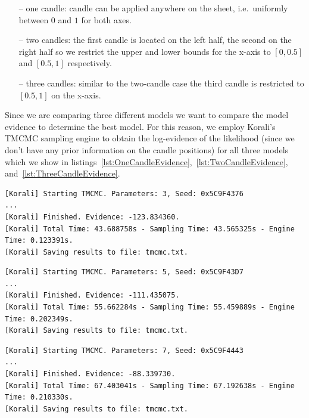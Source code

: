 \documentclass{article}
\begin{document}
    \begin{itemize}
        \item[--] one candle: candle can be applied anywhere on the sheet,
        i.e.\ uniformly between $0$ and $1$ for both axes.
        \item[--] two candles: the first candle is located on the left half,
        the second on the right half so we restrict the upper and lower bounds
        for the x-axis to $[0, 0.5]$ and $[0.5, 1]$ respectively.
        \item[--] three candles: similar to the two-candle case the third
        candle is restricted to $[0.5, 1]$ on the x-axis.
    \end{itemize}

    Since we are comparing three different models we want to compare the
    model evidence to determine the best model.
    For this reason, we employ Korali's TMCMC sampling engine to obtain the
    log-evidence of the likelihood (since we don't have any prior
    information on the candle positions) for all three models which we show in
    listings~\ref{lst:OneCandleEvidence},~\ref{lst:TwoCandleEvidence},
    and~\ref{lst:ThreeCandleEvidence}.

     \begin{lstlisting}[basicstyle=\tiny, frame=single, caption={Korali
    output when sampling the likelihood of the heat distribution given the
     model with one candle.}, label={lst:OneCandleEvidence}]
[Korali] Starting TMCMC. Parameters: 3, Seed: 0x5C9F4376
...
[Korali] Finished. Evidence: -123.834360.
[Korali] Total Time: 43.688758s - Sampling Time: 43.565325s - Engine Time: 0.123391s.
[Korali] Saving results to file: tmcmc.txt.
    \end{lstlisting}
     \begin{lstlisting}[basicstyle=\tiny, frame=single, caption={Korali
    output when sampling the likelihood of the heat distribution given the
     model with two candles.}, label={lst:TwoCandleEvidence}]
[Korali] Starting TMCMC. Parameters: 5, Seed: 0x5C9F43D7
...
[Korali] Finished. Evidence: -111.435075.
[Korali] Total Time: 55.662284s - Sampling Time: 55.459889s - Engine Time: 0.202349s.
[Korali] Saving results to file: tmcmc.txt.
    \end{lstlisting}
     \begin{lstlisting}[basicstyle=\tiny, frame=single, caption={Korali
    output when sampling the likeilhood of the heat distribution given the
     model with three candles.}, label={lst:ThreeCandleEvidence}]
[Korali] Starting TMCMC. Parameters: 7, Seed: 0x5C9F4443
...
[Korali] Finished. Evidence: -88.339730.
[Korali] Total Time: 67.403041s - Sampling Time: 67.192638s - Engine Time: 0.210330s.
[Korali] Saving results to file: tmcmc.txt.
    \end{lstlisting}
\end{document}

